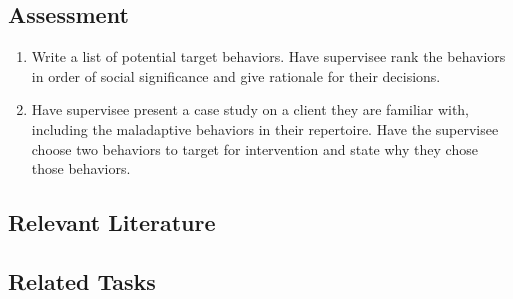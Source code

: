 \subsection{Assessment}
\begin{enumerate}
\item Write a list of potential target behaviors. Have supervisee rank the behaviors in order of social significance and give rationale for their decisions.
\item Have supervisee present a case study on a client they are familiar with, including the maladaptive behaviors in their repertoire. Have the supervisee choose two behaviors to target for intervention and state why they chose those behaviors.
\end{enumerate}
%
\subsection{Relevant Literature}
\begin{refsection}
\nocite{ayllon1968token,
        cooper2007applied,
        hawkins1984meaningful,
        hawkins1986selection,
        rosales1997behavioral}
\printbibliography[heading=none]
\end{refsection}
\subsection{Related Tasks}
\fourbOne{}\\ 
\fourgThree{}\\
\fourgFive{}\\
\fouriOne{}\\
\fourjOne{}\\
\fourjFive{}\\
\fourjEight{}\\
\fourjTen{}\\
\fourjThirteen{}\\
\fourFKTen{}\\
